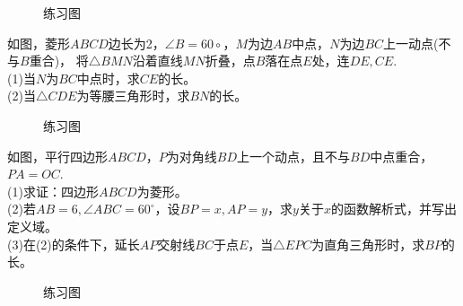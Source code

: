 \begin{figure}[H]
    \centering
    \resizebox{4cm}{!}{}
    \caption{练习图}
\end{figure}
\begin{problem}
如图，菱形$ABCD$边长为2，$\angle B=60\circ$，$M$为边$AB$中点，$N$为边$BC$上一动点(不与$B$重合)，
将$\triangle BMN$沿着直线$MN$折叠，点$B$落在点$E$处，连$DE,CE$. \\
(1)当$N$为$BC$中点时，求$CE$的长。\\
(2)当$\triangle CDE$为等腰三角形时，求$BN$的长。
\end{problem}
\begin{figure}[H]
    \centering
    \resizebox{6cm}{!}{}
    \caption{练习图}
\end{figure}
\begin{problem}
如图，平行四边形$ABCD$，$P$为对角线$BD$上一个动点，且不与$BD$中点重合，$PA=OC$.\\
(1)求证：四边形$ABCD$为菱形。\\
(2)若$AB=6,\angle ABC=60^\circ$，设$BP=x,AP=y$，求$y$关于$x$的函数解析式，并写出定义域。\\
(3)在(2)的条件下，延长$AP$交射线$BC$于点$E$，当$\triangle EPC$为直角三角形时，求$BP$的长。 \\
\end{problem}
\begin{figure}[H]
    \centering
    \resizebox{6cm}{!}{}
    \caption{练习图}
\end{figure}
\clearpage
